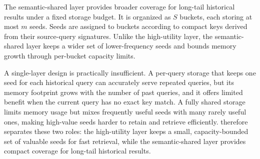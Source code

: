 The semantic-shared layer provides broader coverage for long-tail historical results under a fixed storage budget.
It is organized as $S$ buckets, each storing at most $m$ seeds.
Seeds are assigned to buckets according to compact keys derived from their source-query signatures.
Unlike the high-utility layer, the semantic-shared layer keeps a wider set of lower-frequency seeds and bounds memory growth through per-bucket capacity limits.

A single-layer design is practically insufficient.
A per-query storage that keeps one seed for each historical query can accurately serve repeated queries, but its memory footprint grows with the number of past queries, and it offers limited benefit when the current query has no exact key match.
A fully shared storage limits memory usage but mixes frequently useful seeds with many rarely useful ones, making high-value seeds harder to retain and retrieve efficiently.
\system therefore separates these two roles: the high-utility layer keeps a small, capacity-bounded set of valuable seeds for fast retrieval, while the semantic-shared layer provides compact coverage for long-tail historical results.












